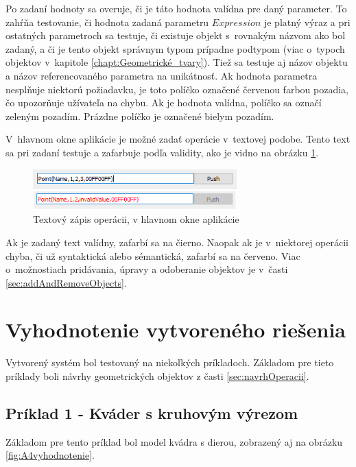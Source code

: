 Po zadaní hodnoty sa overuje, či je táto hodnota valídna pre daný parameter. To zahŕňa testovanie, či hodnota zadaná parametru $Expression$ je platný výraz a pri ostatných parametroch sa testuje, či existuje objekt s~rovnakým názvom ako bol zadaný, a či je tento objekt správnym typom prípadne podtypom (viac o~typoch objektov v~kapitole  \ref{chapt:Geometrické_tvary}). Tiež sa testuje aj názov objektu a názov referencovaného parametra na unikátnosť.
Ak hodnota parametra nesplňuje niektorú požiadavku, je toto políčko označené červenou farbou pozadia, čo upozorňuje užívateľa na chybu. Ak je hodnota valídna, políčko sa označí zeleným pozadím. Prázdne políčko je označené bielym pozadím. 

V~hlavnom okne aplikácie je možné zadať operácie v~textovej podobe. Tento text sa pri zadaní testuje a zafarbuje podľa validity, ako je vidno na obrázku \ref{fig:text}. 
\begin{figure}[H]
	\centering
	\includegraphics[width=0.7\textwidth]{obrazky-figures/operations text.png}
	\caption{Textový zápis operácii, v hlavnom okne aplikácie}
	\label{fig:text}
\end{figure}
Ak je zadaný text valídny, zafarbí sa na čierno. Naopak ak je v~niektorej operácii chyba, či už syntaktická alebo sémantická, zafarbí sa na červeno. Viac o~možnostiach pridávania, úpravy a odoberanie objektov je v~časti \ref{sec:addAndRemoveObjects}.





\chapter{Vyhodnotenie vytvoreného riešenia}\label{sec:zhodnotenie}

Vytvorený systém bol testovaný na niekoľkých príkladoch. Základom pre tieto príklady boli návrhy geometrických objektov z časti \ref{sec:navrhOperacii}.

\section*{Príklad 1 - Kváder s kruhovým výrezom}
Základom pre tento príklad bol model kvádra s dierou, zobrazený aj na obrázku \ref{fig:A4vyhodnotenie}.

